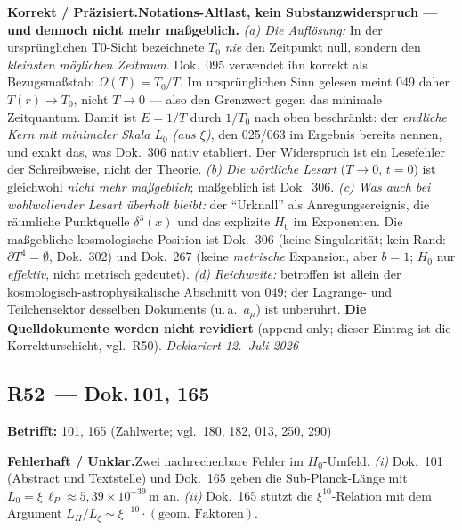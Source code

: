 \smallskip\noindent\textbf{Korrekt / Präzisiert.}\quad \textbf{Notations-Altlast, kein Substanzwiderspruch --- und dennoch nicht mehr maßgeblich.} \emph{(a) Die Auflösung:} In der ursprünglichen T0-Sicht bezeichnete $T_0$ \emph{nie} den Zeitpunkt null, sondern den \emph{kleinsten möglichen Zeitraum}. Dok.~095 verwendet ihn korrekt als Bezugsmaßstab: $\Omega(T)=T_0/T$. Im ursprünglichen Sinn gelesen meint 049 daher $T(r)\to T_0$, nicht $T\to 0$ --- also den Grenzwert gegen das minimale Zeitquantum. Damit ist $E=1/T$ durch $1/T_0$ nach oben beschränkt: der \emph{endliche Kern mit minimaler Skala $L_0$ (aus $\xi$)}, den 025/063 im Ergebnis bereits nennen, und exakt das, was Dok.~306 nativ etabliert. Der Widerspruch ist ein Lesefehler der Schreibweise, nicht der Theorie. \emph{(b) Die wörtliche Lesart} ($T\to 0$, $t=0$) ist gleichwohl \emph{nicht mehr maßgeblich}; maßgeblich ist Dok.~306. \emph{(c) Was auch bei wohlwollender Lesart überholt bleibt:} der \enquote{Urknall} als Anregungsereignis, die räumliche Punktquelle $\delta^3(x)$ und das explizite $H_0$ im Exponenten. Die maßgebliche kosmologische Position ist Dok.~306 (keine Singularität; kein Rand: $\partial T^4=\emptyset$, Dok.~302) und Dok.~267 (keine \emph{metrische} Expansion, aber $b=1$; $H_0$ nur \emph{effektiv}, nicht metrisch gedeutet). \emph{(d) Reichweite:} betroffen ist allein der kosmologisch-astrophysikalische Abschnitt von 049; der Lagrange- und Teilchensektor desselben Dokuments (u.\,a.\ $a_\mu$) ist unberührt. \textbf{Die Quelldokumente werden nicht revidiert} (append-only; dieser Eintrag ist die Korrekturschicht, vgl.\ R50). \emph{Deklariert 12.~Juli 2026}


\medskip


\subsection*{R52~--- Dok.\,101, 165}

\noindent\textbf{Betrifft:} 101, 165 (Zahlwerte; vgl.\ 180, 182, 013, 250, 290)


\smallskip\noindent\textbf{Fehlerhaft / Unklar.}\quad Zwei nachrechenbare Fehler im $H_0$-Umfeld. \emph{(i)} Dok.~101 (Abstract und Textstelle) und Dok.~165 geben die Sub-Planck-Länge mit $L_0 = \xi\,\ell_P \approx 5{,}39\times10^{-39}$\,m an. \emph{(ii)} Dok.~165 stützt die $\xi^{10}$-Relation mit dem Argument $L_H/L_\xi \sim \xi^{-10}\cdot(\text{geom.\ Faktoren})$.



